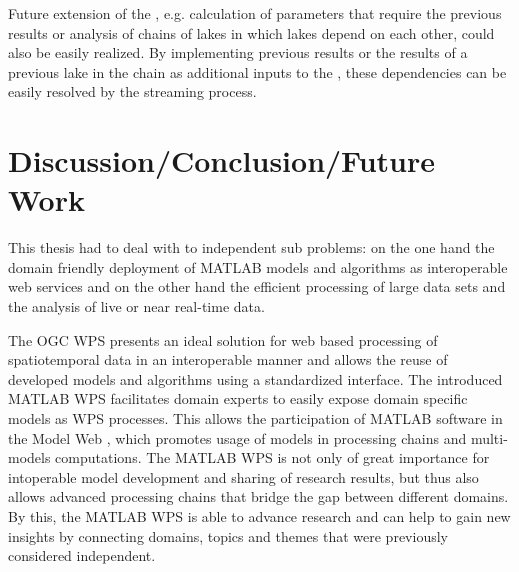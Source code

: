     Future extension of the \la, e.g. calculation of parameters that require the previous results or analysis of chains of lakes in which lakes depend on each other, could also be easily realized. By implementing previous results or the results of a previous lake in the chain as additional inputs to the \la, these dependencies can be easily resolved by the streaming process.

\chapter{Discussion/Conclusion/Future Work}
  This thesis had to deal with to independent sub problems: on the one hand the domain friendly deployment of MATLAB models and algorithms as interoperable web services and on the other hand the efficient processing of large data sets and the analysis of live or near real-time data.

  The \ac{OGC} \acl{WPS} presents an ideal solution for web based processing of spatiotemporal data in an interoperable manner and allows the reuse of developed models and algorithms using a standardized interface. The introduced MATLAB WPS facilitates domain experts to easily expose domain specific models as WPS processes. This allows the participation of MATLAB software in the Model Web \citep{geller2008looking}, which promotes usage of models in processing chains and multi-models computations. The MATLAB WPS is not only of great importance for intoperable model development and sharing of research results, but thus also allows advanced processing chains that bridge the gap between different domains. By this, the MATLAB WPS is able to advance research and can help to gain new insights by connecting domains, topics and themes that were previously considered independent.


